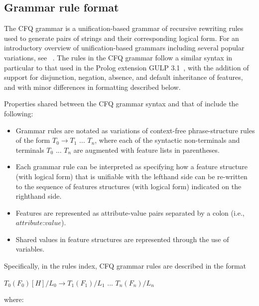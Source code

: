 \documentclass[letterpaper]{article}
\begin{document}
\subsection{Grammar rule format}

The CFQ grammar is a unification-based grammar of recursive rewriting rules used to generate pairs of strings and their corresponding logical form. For an introductory overview of unification-based grammars including several popular variations, see ~\citet{shieber2003introduction}. The rules in the CFQ grammar follow a similar syntax in particular to that used in the Prolog extension GULP 3.1~\citep{covington1994gulp}, with the addition of support for disjunction, negation, absence, and default inheritance of features, and with minor differences in formatting described below.

Properties shared between the CFQ grammar syntax and that of \citep{covington1994gulp} include the following:

\begin{itemize}
    \item Grammar rules are notated as variations of context-free phrase-structure rules of the form $T_{0} \rightarrow T_{1}$ ... $T_{n}$, where each of the syntactic non-terminals and terminals $T_{0}$ ... $T_{n}$ are augmented with feature lists in parentheses.
    \item Each grammar rule can be interpreted as specifying how a feature structure (with logical form) that is unifiable with the lefthand side can be re-written to the sequence of features structures (with logical form) indicated on the righthand side.
    \item Features are represented as attribute-value pairs separated by a colon (i.e., $attribute$:$value$).
    \item Shared values in feature structures are represented through the use of variables.
\end{itemize}

Specifically, in the rules index, CFQ grammar rules are described in the format

\begin{flushleft}
$T_{0}(F_{0})[H]/L_{0} \rightarrow T_{1}(F_{1})/L_{1}$ ... $T_{n}(F_{n})/L_{n}$
\end{flushleft}

\noindent where:
\end{document}
